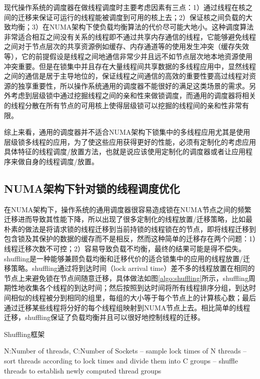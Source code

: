 现代操作系统的调度器在做线程调度时主要考虑因素有三点：1）通过线程在核之间的迁移来保证可运行的线程能被调度到可用的核上去；2）保证核之间负载的大致均衡；3）在NUMA架构下使负载均衡算法的代价尽可能大地小。这种调度算法非常适合相互之间没有关系的线程即不通过共享内存通信的线程，它能够避免线程之间对于节点层次的共享资源例如缓存、内存通道等的使用发生冲突（缓存失效等），它的前提假设是线程之间地通信非常少并且远不如节点层次地本地资源使用冲突重要。但是在锁集中并且存在大量线程间共享数据的多线程应用中，显然线程之间的通信是居于主导地位的，保证线程之间通信的高效的重要性要高过线程对资源的独享重要性\cite{dice2015lock}，所以操作系统通用的调度器不能很好的满足这类场景的需求。另外考虑到层级锁中通过挖掘线程之间的亲和性来做锁调度，而通用的调度器将相关的线程分散在所有节点的可用核上使得层级锁可以挖掘的线程间的亲和性非常有限。

综上来看，通用的调度器并不适合NUMA架构下锁集中的多线程应用尤其是使用层级锁多线程的应用，为了使这些应用获得更好的性能，必须有定制化的考虑应用具体特征的线程调度/放置方法，也就是说应该使用定制化的调度器或者让应用程序来做自身的线程调度/放置。


\subsection{NUMA架构下针对锁的线程调度优化}
在NUMA架构下，操作系统的通用调度器很容易造成锁在NUMA节点之间的频繁迁移进而导致其性能下降，所以出现了很多定制化的线程放置/迁移策略，比如最朴素的做法是将请求锁的线程迁移到当前持锁的线程锁在的节点，即将线程迁移到包含锁及其保护的数据的缓存而不是相反，然而这种简单的迁移存在两个问题：1）线程迁移次数不可控；2）容易导致负载不均衡，最终的结果可能是得不偿失。shuffling\cite{pusukuri2014shuffling}是一种能够兼顾负载均衡和迁移代价的适合锁集中的应用的线程放置/迁移策略。shuffling通过将到达时间（lock arrival time）差不多的线程放置在相同的节点上来避免锁在节点间随意迁移，具体做法如图\ref{algo:shuffling}所示，shuffling周期性地收集各个线程的到达时间；然后按照到达时间将所有线程排序分组，到达时间相似的线程被分到相同的组里，每组的大小等于每个节点上的计算核心数；最后通过迁移某些线程将分好的每个线程组映射到NUMA节点上去。相比简单的线程迁移，shuffling保证了负载均衡并且可以很好地控制线程的迁移。

\begin{algorithm}
\caption{Shuffling框架}
\label{algo:shuffling}
\begin{algorithmic}[1] %
\Require N:Number of threads, C:Number of Sockets %
\Repeat
{} -- sample lock times of N threads
     -- sort threads according to lock times and divide them into C groups
     -- shuffle threads to establish newly computed thread groups
\EndIf
{}
\end{algorithmic}
\end{algorithm}

